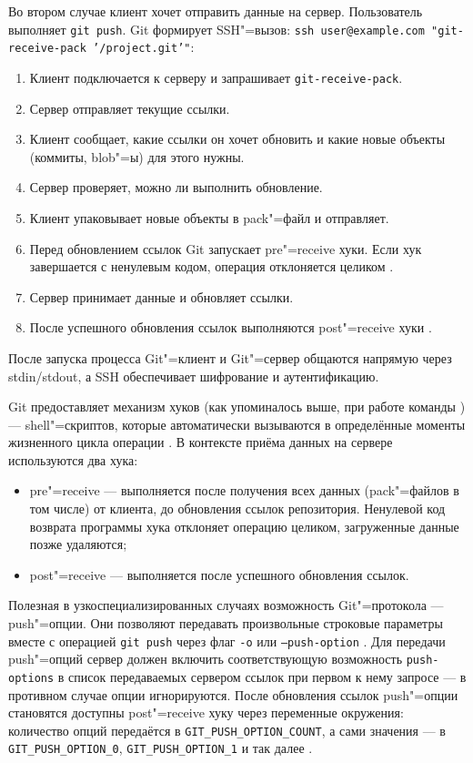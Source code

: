 \documentclass[coursework]{SCWorks}
\begin{document}
Во втором случае клиент хочет отправить данные на сервер. Пользователь выполняет \texttt{git push}. Git формирует SSH"=вызов: \texttt{ssh user@example.com "git-receive-pack '/project.git'"}:
\begin{enumerate}
	\item Клиент подключается к серверу и запрашивает \texttt{git-receive-pack}.
	\item Сервер отправляет текущие ссылки.
	\item Клиент сообщает, какие ссылки он хочет обновить и какие новые объекты (коммиты, blob"=ы) для этого нужны.
	\item Сервер проверяет, можно ли выполнить обновление.
	\item Клиент упаковывает новые объекты в pack"=файл и отправляет.
	\item Перед обновлением ссылок Git запускает pre"=receive хуки. Если хук завершается с ненулевым кодом, операция отклоняется целиком \cite{githooks}.
	\item Сервер принимает данные и обновляет ссылки.
	\item После успешного обновления ссылок выполняются post"=receive хуки \cite{githooks}.
\end{enumerate}

После запуска процесса Git"=клиент и Git"=сервер общаются напрямую через stdin/stdout, а SSH обеспечивает шифрование и аутентификацию.

Git предоставляет механизм хуков (как упоминалось выше, при работе команды  ) --- shell"=скриптов, которые автоматически вызываются в определённые моменты жизненного цикла операции \cite{githooks}. В контексте приёма данных на сервере используются два хука:

\begin{itemize}
	\item pre"=receive --- выполняется после получения всех данных (pack"=файлов в том числе) от клиента, до обновления ссылок репозитория. Ненулевой код возврата программы хука отклоняет операцию целиком, загруженные данные позже удаляются;
	\item post"=receive --- выполняется после успешного обновления ссылок.
\end{itemize}

Полезная в узкоспециализированных случаях возможность Git"=протокола --- push"=опции. Они позволяют передавать произвольные строковые параметры вместе с операцией \texttt{git push} через флаг \texttt{-o} или \texttt{--push-option} \cite{gitprotocolpack}. Для передачи push"=опций сервер должен включить соответствующую возможность \texttt{push-options} в список передаваемых сервером ссылок при первом к нему запросе --- в противном случае опции игнорируются. После обновления ссылок push"=опции становятся доступны post"=receive хуку через переменные окружения: количество опций передаётся в \texttt{GIT\_PUSH\_OPTION\_COUNT}, а сами значения --- в \texttt{GIT\_PUSH\_OPTION\_0}, \texttt{GIT\_PUSH\_OPTION\_1} и так далее \cite{githooks}.
\end{document}
